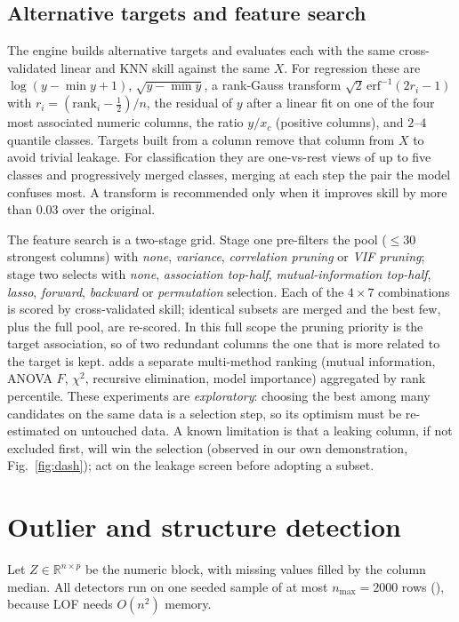 \documentclass[conference]{IEEEtran}
\begin{document}
\subsection{Alternative targets and feature search}
The engine builds alternative targets and evaluates each with the same cross-validated linear and KNN skill against the same $X$. For regression these are $\log(y-\min y+1)$, $\sqrt{y-\min y}$, a rank-Gauss transform $\sqrt2\,\mathrm{erf}^{-1}(2r_i-1)$ with $r_i=(\mathrm{rank}_i-\tfrac12)/n$, the residual of $y$ after a linear fit on one of the four most associated numeric columns, the ratio $y/x_c$ (positive columns), and $2$--$4$ quantile classes. Targets built from a column remove that column from $X$ to avoid trivial leakage. For classification they are one-vs-rest views of up to five classes and progressively merged classes, merging at each step the pair the model confuses most. A transform is recommended only when it improves skill by more than $0.03$ over the original.

The feature search is a two-stage grid. Stage one pre-filters the pool ($\le30$ strongest columns) with \emph{none}, \emph{variance}, \emph{correlation pruning} or \emph{VIF pruning}; stage two selects with \emph{none}, \emph{association top-half}, \emph{mutual-information top-half}, \emph{lasso}, \emph{forward}, \emph{backward} or \emph{permutation} selection. Each of the $4\times7$ combinations is scored by cross-validated skill; identical subsets are merged and the best few, plus the full pool, are re-scored. In this full scope the pruning priority is the target association, so of two redundant columns the one that is more related to the target is kept.  adds a separate multi-method ranking (mutual information, ANOVA $F$, $\chi^2$, recursive elimination, model importance) aggregated by rank percentile. These experiments are \emph{exploratory}: choosing the best among many candidates on the same data is a selection step, so its optimism must be re-estimated on untouched data. A known limitation is that a leaking column, if not excluded first, will win the selection (observed in our own demonstration, Fig.~\ref{fig:dash}); act on the leakage screen before adopting a subset.

\section{Outlier and structure detection}\label{sec:outliers}
Let $Z\in\mathbb R^{n\times p}$ be the numeric block, with missing values filled by the column median. All detectors run on one seeded sample of at most $n_{\max}=2000$ rows (), because LOF needs $O(n^2)$ memory.
\end{document}
